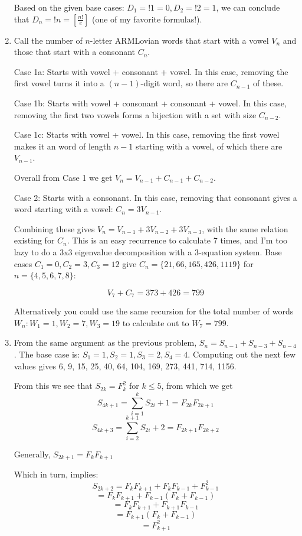 \documentclass{book}
\numberwithin{equation}{section}
\begin{document}
\begin{enumerate}[label={5.\arabic*}]
Based on the given base
cases: $D_1 = !1 = 0, D_2 = !2 = 1$, we can conclude that $D_n = !n = \left[\frac{n!}{e}\right]$ (one of my
favorite formulas!).

\item
Call the number of $n$-letter ARMLovian words that start with a vowel $V_n$ and those that start
with a consonant $C_n$.

Case 1a: Starts with vowel + consonant + vowel. In this case, removing the first vowel turns it into a
$(n-1)$-digit word, so there are $C_{n-1}$ of these.

Case 1b: Starts with vowel + consonant + consonant + vowel. In this case, removing the first two
vowels forms a bijection with a set with size $C_{n-2}$.

Case 1c: Starts with vowel + vowel. In this case, removing the first vowel makes it an word of length
$n-1$ starting with a vowel, of which there are $V_{n-1}$.

Overall from Case 1 we get $V_n = V_{n-1} + C_{n-1} + C_{n-2}$.

Case 2: Starts with a consonant. In this case, removing that consonant gives a word starting with
a vowel: $C_n = 3V_{n-1}$.

Combining these gives $V_n = V_{n-1} + 3V_{n-2} + 3V_{n-3}$, with the same relation existing for $C_n$. This is
an easy recurrence to calculate 7 times, and I'm too lazy to do a 3x3 eigenvalue decomposition with a 3-equation
system. Base cases $C_1 = 0, C_2 = 3, C_3 = 12$ give $C_n = \{ 21, 66, 165, 426, 1119 \}$
for $n = \{4, 5, 6, 7, 8\}$:

$$V_7 + C_7 = 373 + 426 = 799$$

Alternatively you could use the same recursion for the total number of words $W_n: W_1 = 1, W_2 = 7, W_3 = 19$
to calculate out to $W_7 = 799$.

\item
From the same argument as the previous problem, $S_n = S_{n-1} + S_{n-3} + S_{n-4}$. The base case is:
$S_1 = 1, S_2 = 1, S_3 = 2, S_4 = 4$. Computing out the next few values gives 6, 9, 15, 25, 40, 64, 104, 169,
273, 441, 714, 1156.

From this we see that $S_{2k} = F_k^2$ for $k \leq 5$, from which we get
$$S_{4k+1} = \sum_{i=1}^{k} S_{2i} + 1 = F_{2k}F_{2k+1}$$
$$S_{4k+3} = \sum_{i=2}^{k+1} S_{2i} + 2 = F_{2k+1}F_{2k+2}$$

Generally, $S_{2k+1} = F_{k}F_{k+1}$

Which in turn, implies:
$$S_{2k+2} = F_{k}F_{k+1} + F_{k}F_{k-1} + F_{k-1}^2$$
$$=F_{k}F_{k+1} + F_{k-1}(F_{k} + F_{k-1})$$
$$=F_{k}F_{k+1} + F_{k+1}F_{k-1}$$
$$=F_{k+1}(F_k + F_{k-1})$$
$$=F_{k+1}^2$$


\end{enumerate}
\end{document}
